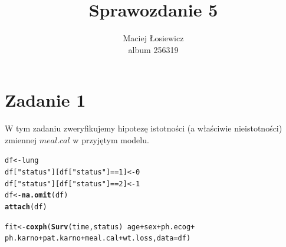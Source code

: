 \documentclass[12pt, a4paper]{article}\usepackage[]{graphicx}\usepackage[]{color}
\makeatletter
\newcommand{\hlnum}[1]{\textcolor[rgb]{0.686,0.059,0.569}{#1}}%
\newcommand{\hlstr}[1]{\textcolor[rgb]{0.192,0.494,0.8}{#1}}%
\newcommand{\hlopt}[1]{\textcolor[rgb]{0,0,0}{#1}}%
\newcommand{\hlstd}[1]{\textcolor[rgb]{0.345,0.345,0.345}{#1}}%
\newcommand{\hlkwb}[1]{\textcolor[rgb]{0.69,0.353,0.396}{#1}}%
\newcommand{\hlkwc}[1]{\textcolor[rgb]{0.333,0.667,0.333}{#1}}%
\newcommand{\hlkwd}[1]{\textcolor[rgb]{0.737,0.353,0.396}{\textbf{#1}}}%
\newenvironment{kframe}{%
 \def\at@end@of@kframe{}%
 \ifinner\ifhmode%
  \def\at@end@of@kframe{\end{minipage}}%
  \begin{minipage}{\columnwidth}%
 \fi\fi%
 \def\FrameCommand##1{\hskip\@totalleftmargin \hskip-\fboxsep
 \colorbox{shadecolor}{##1}\hskip-\fboxsep
     \hskip-\linewidth \hskip-\@totalleftmargin \hskip\columnwidth}%
 \MakeFramed {\advance\hsize-\width
   \@totalleftmargin\z@ \linewidth\hsize
   \@setminipage}}%
 {\par\unskip\endMakeFramed%
 \at@end@of@kframe}
\newenvironment{knitrout}{}{} %
\makeatother
\begin{document}
\title{Sprawozdanie 5}
\author{Maciej Łosiewicz \\ album 256319}
\maketitle


\section{Zadanie  1}

W tym zadaniu zweryfikujemy hipotezę istotności (a właściwie nieistotności) zmiennej $meal.cal$
w przyjętym modelu.

\begin{knitrout}
\color{fgcolor}\begin{kframe}
\begin{alltt}
\hlstd{df} \hlkwb{<-} \hlstd{lung}
\hlstd{df[}\hlstr{"status"}\hlstd{][df[}\hlstr{"status"}\hlstd{]} \hlopt{==} \hlnum{1}\hlstd{]} \hlkwb{<-} \hlnum{0}
\hlstd{df[}\hlstr{"status"}\hlstd{][df[}\hlstr{"status"}\hlstd{]} \hlopt{==} \hlnum{2}\hlstd{]} \hlkwb{<-} \hlnum{1}
\hlstd{df} \hlkwb{<-} \hlkwd{na.omit}\hlstd{(df)}
\hlkwd{attach}\hlstd{(df)}


\hlstd{fit} \hlkwb{<-} \hlkwd{coxph}\hlstd{(}\hlkwd{Surv}\hlstd{(time, status)} \hlopt{~} \hlstd{age} \hlopt{+} \hlstd{sex} \hlopt{+} \hlstd{ph.ecog} \hlopt{+}
               \hlstd{ph.karno} \hlopt{+} \hlstd{pat.karno} \hlopt{+} \hlstd{meal.cal} \hlopt{+} \hlstd{wt.loss,} \hlkwc{data} \hlstd{= df)}


\end{alltt}
\end{kframe}
\end{knitrout}
\end{document}
